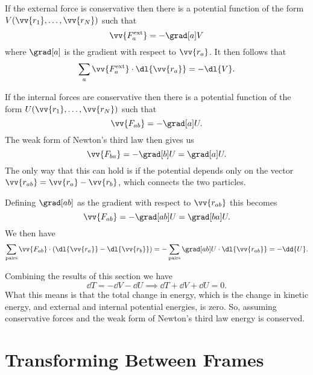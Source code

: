 \documentclass[fleqn]{NotesClass}
\newcommand*{\ext}{\mathrm{ext}}
\begin{document}
    If the external force is conservative then there is a potential function of the form \(V(\vv{r_1}, \dotsc, \vv{r_N})\) such that
    \begin{equation}
        \vv{F_a^{\ext}} = -\grad[a] V
    \end{equation}
    where \(\grad[a]\) is the gradient with respect to \(\vv{r_a}\).
    It then follows that
    \begin{equation}
        \sum_a\vv{F_a^{\ext}}\cdot\dl{\vv{r_a}} = -\dl{V}.
    \end{equation}
    
    If the internal forces are conservative then there is a potential function of the form \(U(\vv{r_1}, \dotsc, \vv{r_N})\) such that
    \begin{equation}
        \vv{F_{ab}} = -\grad[a] U.
    \end{equation}
    The weak form of Newton's third law then gives us
    \begin{equation}
        \vv{F_{ba}} = -\grad[b]U = \grad[a]U.
    \end{equation}
    The only way that this can hold is if the potential depends only on the vector \(\vv{r_{ab}} = \vv{r_a} - \vv{r_b}\), which connects the two particles.
    
    Defining \(\grad[ab]\) as the gradient with respect to \(\vv{r_{ab}}\) this becomes
    \begin{equation}
        \vv{F_{ab}} = -\grad[ab]U = \grad[ba] U.
    \end{equation}
    We then have
    \begin{equation}
        \sum_{\text{pairs}} \vv{F_{ab}} \cdot(\dl{\vv{r_a}} - \dl{\vv{r_b}}) = -\sum_{\text{pairs}}\grad[ab]U\cdot\dl{\vv{r_{ab}}} = -\dd{U}.
    \end{equation}
    
    Combining the results of this section we have
    \begin{equation}
        \dd{T} = -\dd{V} - \dd{U} \implies \dd{T} + \dd{V} + \dd{U} = 0.
    \end{equation}
    What this means is that the total change in energy, which is the change in kinetic energy, and external and internal potential energies, is zero.
    So, assuming conservative forces and the weak form of Newton's third law energy is conserved.
    
    \chapter{Transforming Between Frames}
\end{document}

